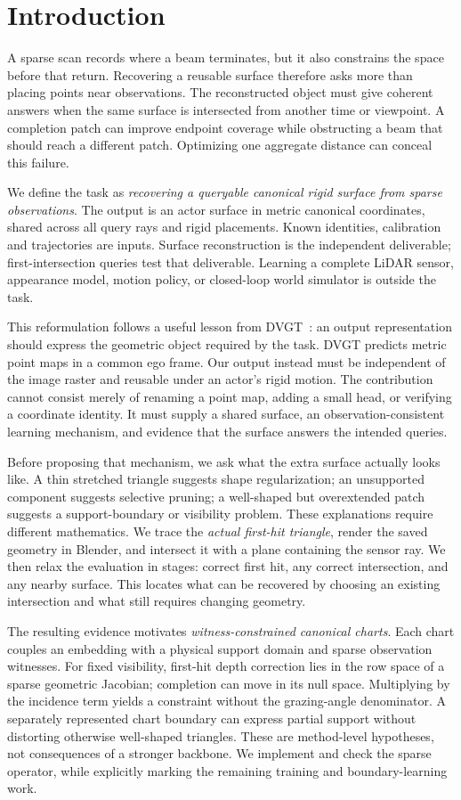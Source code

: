 \section{Introduction}
A sparse scan records where a beam terminates, but it also constrains the space before that return. Recovering a reusable surface therefore asks more than placing points near observations. The reconstructed object must give coherent answers when the same surface is intersected from another time or viewpoint. A completion patch can improve endpoint coverage while obstructing a beam that should reach a different patch. Optimizing one aggregate distance can conceal this failure.

We define the task as \emph{recovering a queryable canonical rigid surface from sparse observations}. The output is an actor surface in metric canonical coordinates, shared across all query rays and rigid placements. Known identities, calibration and trajectories are inputs. Surface reconstruction is the independent deliverable; first-intersection queries test that deliverable. Learning a complete LiDAR sensor, appearance model, motion policy, or closed-loop world simulator is outside the task.

This reformulation follows a useful lesson from DVGT~\cite{dvgt}: an output representation should express the geometric object required by the task. DVGT predicts metric point maps in a common ego frame. Our output instead must be independent of the image raster and reusable under an actor's rigid motion. The contribution cannot consist merely of renaming a point map, adding a small head, or verifying a coordinate identity. It must supply a shared surface, an observation-consistent learning mechanism, and evidence that the surface answers the intended queries.

Before proposing that mechanism, we ask what the extra surface actually looks like. A thin stretched triangle suggests shape regularization; an unsupported component suggests selective pruning; a well-shaped but overextended patch suggests a support-boundary or visibility problem. These explanations require different mathematics. We trace the \emph{actual first-hit triangle}, render the saved geometry in Blender, and intersect it with a plane containing the sensor ray. We then relax the evaluation in stages: correct first hit, any correct intersection, and any nearby surface. This locates what can be recovered by choosing an existing intersection and what still requires changing geometry.

The resulting evidence motivates \emph{witness-constrained canonical charts}. Each chart couples an embedding with a physical support domain and sparse observation witnesses. For fixed visibility, first-hit depth correction lies in the row space of a sparse geometric Jacobian; completion can move in its null space. Multiplying by the incidence term yields a constraint without the grazing-angle denominator. A separately represented chart boundary can express partial support without distorting otherwise well-shaped triangles. These are method-level hypotheses, not consequences of a stronger backbone. We implement and check the sparse operator, while explicitly marking the remaining training and boundary-learning work.

